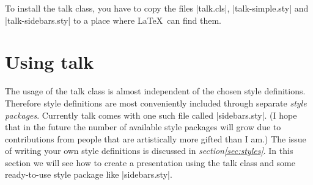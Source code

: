 \documentclass[12pt]{ltxdoc}
\newcommand{\mref}[2]{\textsl{#1\space\ref{#2}}}
\newcommand{\pkg}[1]{\textsf{#1}}
\begin{document}
To install the \pkg{talk} class, you have to copy the files |talk.cls|,
|talk-simple.sty| and |talk-sidebars.sty| to a place where \LaTeX\ can find
them.
%
%
%
\section{Using \pkg{talk}}
%
%
The usage of the \pkg{talk} class is almost independent of the chosen style
definitions. Therefore style definitions are most conveniently included through
separate \emph{style packages}. Currently \pkg{talk} comes with one such file
called |sidebars.sty|. (I hope that in the future the number of available style
packages will grow due to contributions from people that are artistically more
gifted than I am.) The issue of writing your own style definitions is discussed
in \mref{section}{sec:styles}. In this section we will see how to create a
presentation using the \pkg{talk} class and some ready-to-use style package like
|sidebars.sty|.
\end{document}
